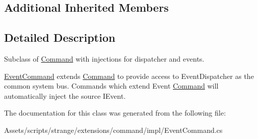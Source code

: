 \subsection*{Additional Inherited Members}


\subsection{Detailed Description}
Subclass of \hyperlink{classstrange_1_1extensions_1_1command_1_1impl_1_1_command}{Command} with injections for dispatcher and events. 

\hyperlink{classstrange_1_1extensions_1_1command_1_1impl_1_1_event_command}{Event\-Command} extends \hyperlink{classstrange_1_1extensions_1_1command_1_1impl_1_1_command}{Command} to provide access to Event\-Dispatcher as the common system bus. Commands which extend Event \hyperlink{classstrange_1_1extensions_1_1command_1_1impl_1_1_command}{Command} will automatically inject the source I\-Event. 

The documentation for this class was generated from the following file\-:\begin{DoxyCompactItemize}
\item 
Assets/scripts/strange/extensions/command/impl/Event\-Command.\-cs\end{DoxyCompactItemize}
